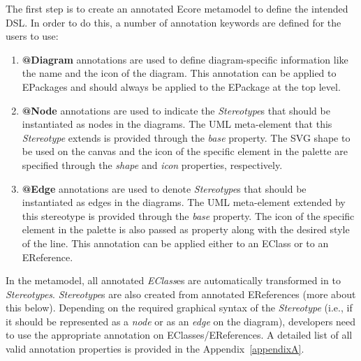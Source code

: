 The first step is to create an annotated Ecore metamodel to define the intended DSL.
In order to do this, a number of annotation keywords are defined for the users to use:

\begin{enumerate}[label=\arabic*.]
	\item \textbf{@Diagram} annotations are used to define diagram-specific information like the name and the icon of the diagram. This annotation can be applied to EPackages and should always be applied to the EPackage at the top level.
	\item \textbf{@Node} annotations are used to indicate the \textit{Stereotype}s that should be instantiated as nodes in the diagrams. 
	The UML meta-element that this \textit{Stereotype} extends is provided through the \emph{base} property. 
	The SVG shape to be used on the canvas and the icon of the specific element in the palette are specified through the \emph{shape} and \emph{icon} properties, respectively. 
	\item \textbf{@Edge} annotations are used to denote \textit{Stereotype}s that should be instantiated as edges in the diagrams. 
	The UML meta-element extended by this stereotype is provided through the \emph{base} property. The icon of the specific element in the palette is also passed as property along with the desired style of the line. 
	This annotation can be applied either to an EClass or to an EReference.
\end{enumerate}

In the metamodel, all annotated \textit{EClass}es are automatically transformed in to \textit{Stereotypes}.
\textit{Stereotype}s are also created from annotated EReferences (more about this below). 
Depending on the required graphical syntax of the \textit{Stereotype} (i.e., if it should be represented as a \textit{node} or as an \textit{edge} on the diagram), developers need to use the appropriate annotation on EClasses/EReferences. 
A detailed list of all valid annotation properties is provided in the Appendix~\ref{appendixA}. 

